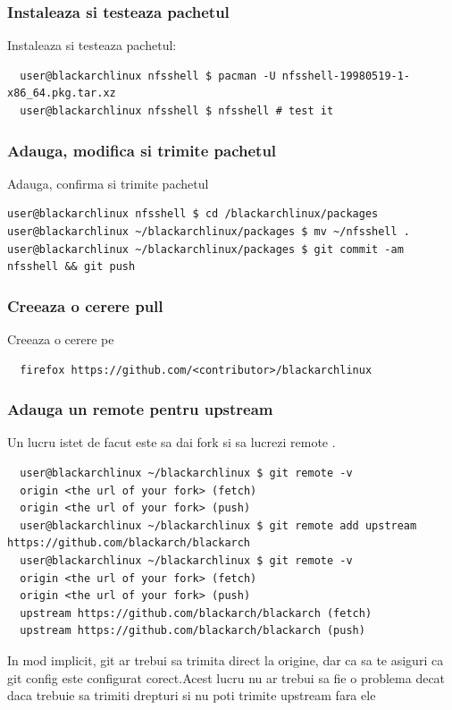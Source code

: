 \documentclass[a4paper, oneside, 11pt]{book}
\def\href#1#2{\htmladdnormallink{#2}{#1}}
\begin{document}
\subsubsection{Instaleaza si testeaza pachetul}
Instaleaza si testeaza pachetul:
\begin{lstlisting}
  user@blackarchlinux nfsshell $ pacman -U nfsshell-19980519-1-x86_64.pkg.tar.xz
  user@blackarchlinux nfsshell $ nfsshell # test it
\end{lstlisting}

\subsubsection{Adauga, modifica si trimite pachetul}
Adauga, confirma si trimite pachetul
\begin{lstlisting}user@blackarchlinux nfsshell $ cd /blackarchlinux/packages
user@blackarchlinux ~/blackarchlinux/packages $ mv ~/nfsshell .
user@blackarchlinux ~/blackarchlinux/packages $ git commit -am nfsshell && git push
\end{lstlisting}

\subsubsection{Creeaza o cerere pull }
Creeaza o cerere pe \href{https://github.com/}{github.com}
\begin{lstlisting}
  firefox https://github.com/<contributor>/blackarchlinux
\end{lstlisting}

\subsubsection{Adauga un remote pentru upstream}
Un lucru istet de facut este sa dai fork si sa lucrezi remote .
\begin{lstlisting}
  user@blackarchlinux ~/blackarchlinux $ git remote -v
  origin <the url of your fork> (fetch)
  origin <the url of your fork> (push)
  user@blackarchlinux ~/blackarchlinux $ git remote add upstream https://github.com/blackarch/blackarch
  user@blackarchlinux ~/blackarchlinux $ git remote -v
  origin <the url of your fork> (fetch)
  origin <the url of your fork> (push)
  upstream https://github.com/blackarch/blackarch (fetch)
  upstream https://github.com/blackarch/blackarch (push)
\end{lstlisting}

In mod implicit, git ar trebui sa trimita direct la origine, dar ca sa te asiguri ca git config este configurat corect.Acest lucru nu ar trebui sa fie o problema decat daca trebuie sa trimiti drepturi si nu poti trimite upstream fara ele
\end{document}
